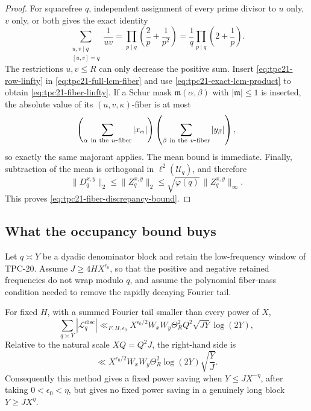 \begin{proof}
For squarefree \(q\), independent assignment of every prime divisor to
\(u\) only, \(v\) only, or both gives the exact identity
\begin{equation}
 \sum_{\substack{u,v\mid q\\{}[u,v]=q}}\frac1{uv}
 =\prod_{p\mid q}\left(\frac2p+\frac1{p^2}\right)
 =\frac1q\prod_{p\mid q}\left(2+\frac1p\right).
 \label{eq:tpc21-exact-lcm-product}
\end{equation}
The restrictions \(u,v\le R\) can only decrease the positive sum.
Insert \eqref{eq:tpc21-row-linfty} in
\eqref{eq:tpc21-full-lcm-fiber} and use
\eqref{eq:tpc21-exact-lcm-product} to obtain
\eqref{eq:tpc21-fiber-linfty}.  If a Schur mask
\(\mathfrak m(\alpha,\beta)\) with \(|\mathfrak m|\le1\) is inserted,
the absolute value of its \((u,v,\kappa)\)-fiber is at most
\[
 \left(\sum_{\alpha\ {\rm in\ the}\ u{\rm\mbox{-}fiber}}|x_\alpha|\right)
 \left(\sum_{\beta\ {\rm in\ the}\ v{\rm\mbox{-}fiber}}|y_\beta|\right),
\]
so exactly the same majorant applies.  The mean bound is immediate.
Finally,
subtraction of the mean is orthogonal in
\(\ell^2(\mathcal U_q)\), and therefore
\[
 \|D_q^{x,y}\|_2\le\|Z_q^{x,y}\|_2
 \le\sqrt{\varphi(q)}\,\|Z_q^{x,y}\|_\infty.
\]
This proves \eqref{eq:tpc21-fiber-discrepancy-bound}.
\end{proof}

\subsection{What the occupancy bound buys}

Let \(q\asymp Y\) be a dyadic denominator block and retain the
low-frequency window of TPC-20.  Assume \(J\ge4HX^{\epsilon_0}\), so
that the positive and negative retained frequencies do not wrap modulo
\(q\), and assume the polynomial fiber-mass condition needed to remove
the rapidly decaying Fourier tail.

\begin{corollary}
\label{cor:tpc21-dyadic-occupancy}
For fixed \(H\), with a summed Fourier tail smaller than every power of
\(X\),
\begin{equation}
 \sum_{q\asymp Y}|\mathcal L_q^{\mathrm{disc}}|
 \ll_{F,H,\epsilon_0}
 X^{\epsilon_0/2}W_xW_y\Theta_R^2
 Q^2\sqrt{JY}\log(2Y),
 \label{eq:tpc21-dyadic-discrepancy}
\end{equation}
Relative to the
natural scale \(XQ=Q^2J\), the right-hand side is
\begin{equation}
 \ll X^{\epsilon_0/2}W_xW_y\Theta_R^2\log(2Y)
 \sqrt{\frac YJ}.
 \label{eq:tpc21-occupancy-ratio}
\end{equation}
Consequently this method gives a fixed power saving when
\(Y\le JX^{-\eta}\), after taking \(0<\epsilon_0<\eta\), but gives no
fixed power saving in a genuinely long block \(Y\ge JX^\eta\).
\end{corollary}

